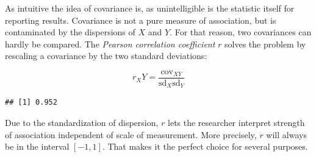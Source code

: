 \documentclass[]{svmono}
\newenvironment{Shaded}{\begin{snugshade}}{\end{snugshade}}
\newcommand{\KeywordTok}[1]{\textcolor[rgb]{0.13,0.29,0.53}{\textbf{#1}}}
\newcommand{\DataTypeTok}[1]{\textcolor[rgb]{0.13,0.29,0.53}{#1}}
\newcommand{\DecValTok}[1]{\textcolor[rgb]{0.00,0.00,0.81}{#1}}
\newcommand{\StringTok}[1]{\textcolor[rgb]{0.31,0.60,0.02}{#1}}
\newcommand{\ControlFlowTok}[1]{\textcolor[rgb]{0.13,0.29,0.53}{\textbf{#1}}}
\newcommand{\OperatorTok}[1]{\textcolor[rgb]{0.81,0.36,0.00}{\textbf{#1}}}
\newcommand{\NormalTok}[1]{#1}
\begin{document}
As intuitive the idea of covariance is, as unintelligible is the
statistic itself for reporting results. Covariance is not a pure measure
of association, but is contaminated by the dispersions of \(X\) and
\(Y\). For that reason, two covariances can hardly be compared. The
\emph{Pearson correlation coefficient} \(r\) solves the problem by
rescaling a covariance by the two standard deviations:

\[
r_XY = \frac{\textrm{cov}_{XY}}{\textrm{sd}_X \textrm{sd}_Y}
\]

\begin{Shaded}
\end{Shaded}

\begin{verbatim}
## [1] 0.952
\end{verbatim}

Due to the standardization of dispersion, \(r\) lets the researcher
interpret strength of association independent of scale of measurement.
More precisely, \(r\) will always be in the interval \([-1,1]\). That
makes it the perfect choice for several purposes.
\end{document}
